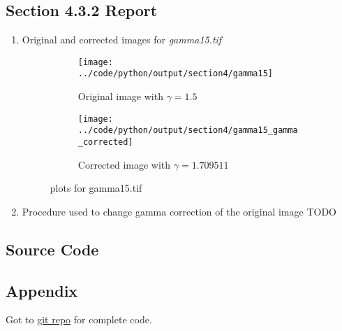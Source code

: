 \documentclass[a4paper,11pt]{article}
\newcommand{\TODO}{{\color{red}TODO}}
\begin{document}
%
\clearpage
\vspace{2ex}
%
\subsection*{Section 4.3.2 Report} 
\begin{enumerate}
\item Original and corrected images for \textit{gamma15.tif}
\begin{figure}[!hp]
 \centering
 \begin{subfigure}{0.45\textwidth}
 \centering
 \texttt{[image: ../code/python/output/section4/gamma15]}
 \caption{Original image with $\gamma=1.5$}
\end{subfigure}
\begin{subfigure}{0.45\textwidth}
 \centering
 \texttt{[image: ../code/python/output/section4/gamma15\_gamma\_corrected]}
 \caption{Corrected image with $\gamma=1.709511$}
\end{subfigure}  
 \caption{plots for gamma15.tif}
\end{figure}

\item Procedure used to change gamma correction of the original image
\TODO

\end{enumerate}


\newpage
\subsection*{Source Code}%



\newpage
\subsection*{Appendix}
Got to \href{https://github.com/rahuldeshmukh43/Courses/tree/master/ECE637-DigitalImageProcessing-I/labs/lab4/code}{git repo} for complete code.





\end{document}
